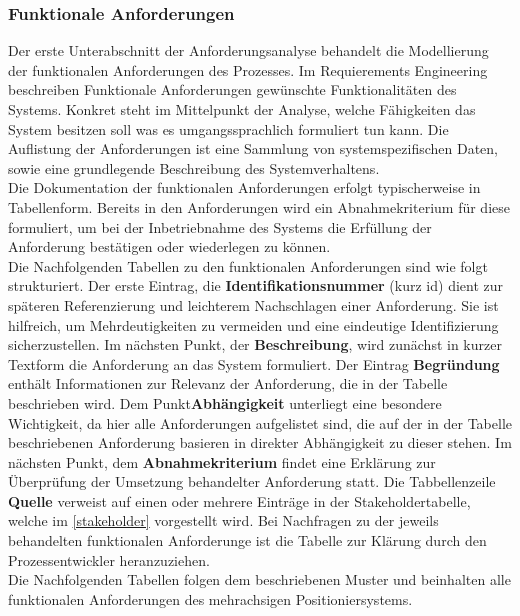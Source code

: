 \documentclass[../../../Bachelorarbeit.tex]{subfiles}
\begin{document}
\subsubsection{Funktionale Anforderungen}
Der erste Unterabschnitt der Anforderungsanalyse behandelt die Modellierung der funktionalen Anforderungen des Prozesses. Im Requierements Engineering beschreiben Funktionale Anforderungen gewünschte Funktionalitäten des Systems. Konkret steht im Mittelpunkt der Analyse, welche Fähigkeiten das System besitzen soll \bzw was es umgangssprachlich formuliert tun kann. Die Auflistung der Anforderungen ist eine Sammlung von systemspezifischen Daten, sowie eine grundlegende Beschreibung des Systemverhaltens. \\ %
Die Dokumentation der funktionalen Anforderungen erfolgt typischerweise in Tabellenform. Bereits in den Anforderungen wird ein Abnahmekriterium für diese formuliert, um bei der Inbetriebnahme des Systems die Erfüllung der Anforderung bestätigen oder wiederlegen zu können.\\ %
Die Nachfolgenden Tabellen zu den funktionalen Anforderungen sind wie folgt strukturiert. Der erste Eintrag, die \textbf{Identifikationsnummer} (kurz \acs{id}) dient zur späteren Referenzierung und leichterem Nachschlagen einer Anforderung. Sie ist hilfreich, um Mehrdeutigkeiten zu vermeiden und eine eindeutige Identifizierung sicherzustellen. Im nächsten Punkt, der \textbf{Beschreibung}, wird zunächst in kurzer Textform die Anforderung an das System formuliert. Der Eintrag \textbf{Begründung} enthält Informationen zur Relevanz der Anforderung, die in der Tabelle beschrieben wird. Dem Punkt\textbf{Abhängigkeit} unterliegt eine besondere Wichtigkeit, da hier alle Anforderungen aufgelistet sind, die auf der in der Tabelle beschriebenen Anforderung basieren \bzw in direkter Abhängigkeit zu dieser stehen. Im nächsten Punkt, dem \textbf{Abnahmekriterium} findet eine Erklärung zur Überprüfung der Umsetzung behandelter Anforderung statt. Die Tabbellenzeile \textbf{Quelle} verweist auf einen oder mehrere Einträge in der Stakeholdertabelle, welche im \autoref{stakeholder} vorgestellt wird. Bei Nachfragen zu der jeweils behandelten funktionalen Anforderunge ist die Tabelle zur Klärung durch den Prozessentwickler heranzuziehen. \\ %
Die Nachfolgenden Tabellen folgen dem beschriebenen Muster und beinhalten alle funktionalen Anforderungen des mehrachsigen Positioniersystems.\\ %
\end{document}
